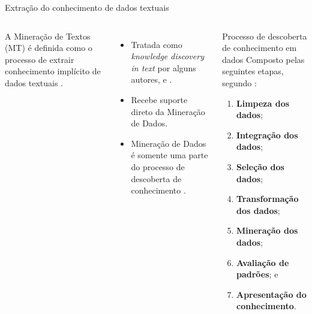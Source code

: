 \documentclass[%
  10pt,%
  aspectratio = 169,%
  compress,%
  t,%
]{beamer}%
\begin{document}
    \begin{frame}[fragile = singleslide]{}{Extração do conhecimento de dados textuais}
        \begin{columns}[t]

        A Mineração de Textos (MT) é definida como o processo de extrair conhecimento implícito de dados textuais \cite{Jo2018TMCIBDC,Feldman:2006:TMH:1076381}.

        \begin{itemize}
            \item Tratada como \textit{knowledge discovery in text} por alguns autores, \cite{Kodratoff:1999:KDT:646358.689959} e \cite{Feldman:1995:KDT:3001335.3001354}.

            \item Recebe suporte direto da Mineração de Dados.

            \item Mineração de Dados é somente uma parte do processo de descoberta de conhecimento \cite[p.~6]{Han:2011:DMC:1972541}.
        \end{itemize}

        \begin{block}{Processo de descoberta de conhecimento em dados}
            Composto pelas seguintes etapas, segundo \cite[p.~6--7]{Han:2011:DMC:1972541}:
            \begin{enumerate}
                \item \textbf{Limpeza dos dados}; %

                \item \textbf{Integração dos dados}; %

                \item \textbf{Seleção dos dados}; %

                \item \textbf{Transformação dos dados}; %

                \item \textbf{Mineração dos dados}; %

                \item \textbf{Avaliação de padrões}; e %
                \item \textbf{Apresentação do conhecimento}. %
            \end{enumerate}
        \end{block}
        \end{columns}
    \end{frame}
\end{document}
